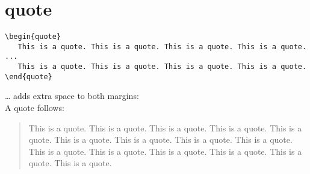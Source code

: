 \documentclass{report}
\begin{document}
\section{quote}
\begin{verbatim}
\begin{quote}
   This is a quote. This is a quote. This is a quote. This is a quote. ...
   This is a quote. This is a quote. This is a quote. This is a quote.
\end{quote}
\end{verbatim}
… adds extra space to both margins:\\
A quote follows:
\begin{quote}
	This is a quote. This is a quote. This is a quote. This is a quote. This is a quote.
	This is a quote. This is a quote. This is a quote. This is a quote. This is a quote.
	This is a quote. This is a quote. This is a quote. This is a quote. This is a quote.
\end{quote}
\end{document}
